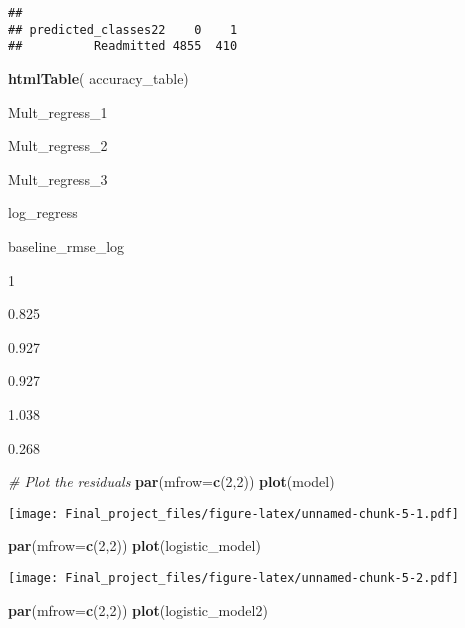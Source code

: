 \documentclass[
]{article}
\newenvironment{Shaded}{\begin{snugshade}}{\end{snugshade}}
\newcommand{\AttributeTok}[1]{\textcolor[rgb]{0.13,0.29,0.53}{#1}}
\newcommand{\CommentTok}[1]{\textcolor[rgb]{0.56,0.35,0.01}{\textit{#1}}}
\newcommand{\DecValTok}[1]{\textcolor[rgb]{0.00,0.00,0.81}{#1}}
\newcommand{\FunctionTok}[1]{\textcolor[rgb]{0.13,0.29,0.53}{\textbf{#1}}}
\newcommand{\NormalTok}[1]{#1}
\begin{document}
\begin{verbatim}
##                    
## predicted_classes22    0    1
##          Readmitted 4855  410
\end{verbatim}

\begin{Shaded}
\begin{Highlighting}[]
\FunctionTok{htmlTable}\NormalTok{( accuracy\_table)}
\end{Highlighting}
\end{Shaded}

Mult\_regress\_1

Mult\_regress\_2

Mult\_regress\_3

log\_regress

baseline\_rmse\_log

1

0.825

0.927

0.927

1.038

0.268

\begin{Shaded}
\begin{Highlighting}[]
\CommentTok{\# Plot the residuals }
\FunctionTok{par}\NormalTok{(}\AttributeTok{mfrow=}\FunctionTok{c}\NormalTok{(}\DecValTok{2}\NormalTok{,}\DecValTok{2}\NormalTok{))}
\FunctionTok{plot}\NormalTok{(model)}
\end{Highlighting}
\end{Shaded}

\texttt{[image: Final\_project\_files/figure-latex/unnamed-chunk-5-1.pdf]}

\begin{Shaded}
\begin{Highlighting}[]
\FunctionTok{par}\NormalTok{(}\AttributeTok{mfrow=}\FunctionTok{c}\NormalTok{(}\DecValTok{2}\NormalTok{,}\DecValTok{2}\NormalTok{))}
\FunctionTok{plot}\NormalTok{(logistic\_model)}
\end{Highlighting}
\end{Shaded}

\texttt{[image: Final\_project\_files/figure-latex/unnamed-chunk-5-2.pdf]}

\begin{Shaded}
\begin{Highlighting}[]
\FunctionTok{par}\NormalTok{(}\AttributeTok{mfrow=}\FunctionTok{c}\NormalTok{(}\DecValTok{2}\NormalTok{,}\DecValTok{2}\NormalTok{))}
\FunctionTok{plot}\NormalTok{(logistic\_model2)}
\end{Highlighting}
\end{Shaded}
\end{document}
